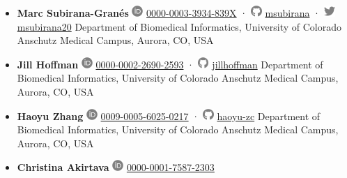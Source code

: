 \begin{itemize}
\item
  \textbf{Marc Subirana-Granés}
  \includegraphics[width=0.16667in,height=0.16667in]{images/orcid.svg}
  \href{https://orcid.org/0000-0003-3934-839X}{0000-0003-3934-839X}
  · \includegraphics[width=0.16667in,height=0.16667in]{images/github.svg}
  \href{https://github.com/msubirana}{msubirana}
  · \includegraphics[width=0.16667in,height=0.16667in]{images/twitter.svg}
  \href{https://twitter.com/msubirana20}{msubirana20}
  Department of Biomedical Informatics, University of Colorado Anschutz Medical Campus, Aurora, CO, USA
\item
  \textbf{Jill Hoffman}
  \includegraphics[width=0.16667in,height=0.16667in]{images/orcid.svg}
  \href{https://orcid.org/0000-0002-2690-2593}{0000-0002-2690-2593}
  · \includegraphics[width=0.16667in,height=0.16667in]{images/github.svg}
  \href{https://github.com/jillhoffman}{jillhoffman}
  Department of Biomedical Informatics, University of Colorado Anschutz Medical Campus, Aurora, CO, USA
\item
  \textbf{Haoyu Zhang}
  \includegraphics[width=0.16667in,height=0.16667in]{images/orcid.svg}
  \href{https://orcid.org/0009-0005-6025-0217}{0009-0005-6025-0217}
  · \includegraphics[width=0.16667in,height=0.16667in]{images/github.svg}
  \href{https://github.com/haoyu-zc}{haoyu-zc}
  Department of Biomedical Informatics, University of Colorado Anschutz Medical Campus, Aurora, CO, USA
\item
  \textbf{Christina Akirtava}
  \includegraphics[width=0.16667in,height=0.16667in]{images/orcid.svg}
  \href{https://orcid.org/0000-0001-7587-2303}{0000-0001-7587-2303}

\end{itemize}
